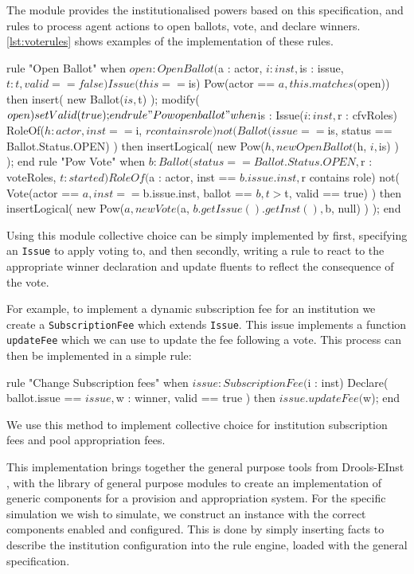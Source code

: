 The module provides the institutionalised powers based on this specification,
and rules to process agent actions to open ballots, vote, and declare winners.
\autoref{lst:voterules} shows examples of the implementation of these rules.

\begin{drools}[label=lst:voterules,caption={Opening of ballots and voting.}]
rule "Open Ballot"
	when
		$open : OpenBallot($a : actor, $i : inst, $is : issue, $t: t, valid == false)
		Issue(this == $is)
		Pow(actor == $a, this.matches($open))
	then
		insert( new Ballot($is, $t) );
		modify($open) {
			setValid(true);
		}
end
rule "Pow open ballot"
	when
		$is : Issue($i : inst, $r : cfvRoles)
		RoleOf($h : actor, inst == $i, $r contains role)
		not( Ballot(issue == $is, status == Ballot.Status.OPEN) )
	then
		insertLogical( new Pow($h, new OpenBallot($h, $i, $is) ) );
end
rule "Pow Vote"
	when
		$b : Ballot(status == Ballot.Status.OPEN, $r : voteRoles, $t : started)
		RoleOf($a : actor, inst == $b.issue.inst, $r contains role)
		not( Vote(actor == $a, inst == $b.issue.inst, ballot == $b, t > $t, valid == true) )
	then
		insertLogical( new Pow($a, new Vote($a, $b.getIssue().getInst(), $b, null) ) );
end
\end{drools}

Using this module collective choice can be simply implemented by first,
specifying an \texttt{Issue} to apply voting to, and then secondly, writing a
rule to react to the appropriate winner declaration and update fluents to
reflect the consequence of the vote.

For example, to implement a dynamic subscription fee for an institution we
create a \texttt{SubscriptionFee} which extends \texttt{Issue}. This issue
implements a function \texttt{updateFee} which we can use to update the fee
following a vote. This process can then be implemented in a simple rule:

\begin{droolsinline}
rule "Change Subscription fees"
	when
		$issue : SubscriptionFee($i : inst)
		Declare( ballot.issue == $issue, $w : winner, valid == true )
	then
		$issue.updateFee($w);
end
\end{droolsinline}

We use this method to implement collective choice for institution subscription
fees and pool appropriation fees.


This implementation brings together the general purpose tools from Drools-EInst
, with the library of general purpose modules to create an implementation
of generic components for a provision and appropriation system. For the
specific simulation we wish to simulate, we construct an instance with the
correct components enabled and configured. This is done by simply inserting facts to describe the institution configuration into the rule engine, loaded with the general
specification.

